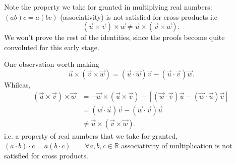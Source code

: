 \documentclass{report}
\begin{document}
{\begin{enumerate}[label=(\roman*)]
Note the property we take for granted in multiplying real numbers: $\left( ab \right)c = a \left( bc  \right)   $ (associativity) is not satisfied for cross products i.e
\[
\left( \vec{u} \times  \vec{v}  \right) \times  \vec{w}  \neq \vec{u} \times  \left( \vec{v}  \times  \vec{w}  \right) 
.\] 
We won't prove the rest of the identities, since the proofs become quite convoluted for this early stage.\\
    \end{enumerate}
One observation worth making 
\[
\vec{ u} \times  \left(  \vec{ v} \times \vec{ w}  \right) = \left(  \vec{ u} \cdot  \vec{ w}  \right) \vec{ v} - \left(  \vec{ u} \cdot  \vec{ v}  \right) \vec{ w}
.\] 
Whileas,
\begin{align*}
  \left( \vec{ u} \times  \vec{ v}  \right) \times  \vec{ w} &= - \vec{ w} \times  \left( \vec{ u} \times  \vec{ v}  \right) - \left[ \left( \vec{ w} \cdot  \vec{ v}  \right) \vec{ u} - \left( \vec{ w} \cdot  \vec{ u}  \right) \vec{ v}  \right]  \\
  &= \left( \vec{ w} \cdot \vec{ u}  \right) \vec{ v} - \left( \vec{ w} \cdot \vec{ v}  \right) \vec{ u} \\
  &\neq \vec{ u} \times  \left( \vec{ v} \times  \vec{ w}  \right) 
.\end{align*}
i.e. a property of real numbers that we take for granted,  $ \left( a \cdot  b \right) \cdot c = a \left( b \cdot  c \right) \qquad  \forall  a,b,c \in \mathbb{R}$ associativity of multiplication is not satisfied for cross products.\\
  } 
\end{document}
